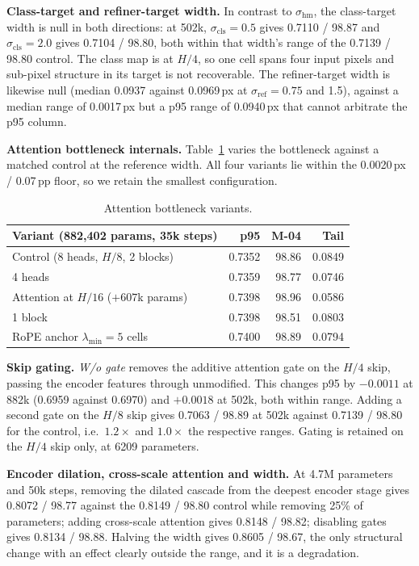 \documentclass[10pt,twocolumn,letterpaper]{article}
\begin{document}
\textbf{Class-target and refiner-target width.} In contrast to $\sigma_{\mathrm{hm}}$, the
class-target width is null in both directions: at 502k, $\sigma_{\mathrm{cls}}=0.5$ gives
0.7110 / 98.87 and $\sigma_{\mathrm{cls}}=2.0$ gives 0.7104 / 98.80, both within that width's range
of the 0.7139 / 98.80 control. The class map is at $H/4$, so one cell spans four input pixels and
sub-pixel structure in its target is not recoverable. The refiner-target width is likewise null
(median 0.0937 against 0.0969\,px at $\sigma_{\mathrm{ref}} = 0.75$ and 1.5), against a median
range of 0.0017\,px but a p95 range of 0.0940\,px that cannot arbitrate the p95 column.

\textbf{Attention bottleneck internals.} Table~\ref{tab:ab_arch} varies the bottleneck against a
matched control at the reference width. All four variants lie within the 0.0020\,px / 0.07\,pp
floor, so we retain the smallest configuration.

\begin{table}[h]
\centering\small
\begin{tabular}{lrrr}
\toprule
Variant (882,402 params, 35k steps) & p95 & M-04 & Tail \\
\midrule
Control (8 heads, $H/8$, 2 blocks) & 0.7352 & 98.86 & 0.0849 \\
4 heads & 0.7359 & 98.77 & 0.0746 \\
Attention at $H/16$ ($+607$k params) & 0.7398 & 98.96 & 0.0586 \\
1 block & 0.7398 & 98.51 & 0.0803 \\
RoPE anchor $\lambda_{\min}{=}5$ cells & 0.7400 & 98.89 & 0.0794 \\
\bottomrule
\end{tabular}
\caption{Attention bottleneck variants.}
\label{tab:ab_arch}
\end{table}

\textbf{Skip gating.} \emph{W/o gate} removes the additive attention gate on the $H/4$ skip,
passing the encoder features through unmodified. This changes p95 by $-0.0011$ at 882k
(0.6959 against 0.6970) and $+0.0018$ at 502k, both within range. Adding a second gate on the $H/8$
skip gives 0.7063 / 98.89 at 502k against 0.7139 / 98.80 for the control, i.e.\ $1.2\times$ and
$1.0\times$ the respective ranges. Gating is retained on the $H/4$ skip only, at 6209 parameters.

\textbf{Encoder dilation, cross-scale attention and width.} At 4.7M parameters and 50k steps,
removing the dilated cascade from the deepest encoder stage gives 0.8072 / 98.77 against the
0.8149 / 98.80 control while removing 25\% of parameters; adding cross-scale attention gives
0.8148 / 98.82; disabling gates gives 0.8134 / 98.88. Halving the width gives 0.8605 / 98.67, the
only structural change with an effect clearly outside the range, and it is a degradation.
\end{document}
